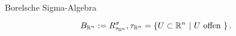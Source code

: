 \documentclass[class=article, crop=false]{standalone}
\begin{document}
\begin{zettel}
\begin{flashcard}[37rz9nm4]{Borelsche Sigma-Algebra}
	\begin{definition}
		\[
			B_{\R^n} := R_{\tau_{\R^n}}^{\sigma}, \tau_{\R^n} = \set{ U \subset  \R^n}{ U \tx{offen} }
		.\]
	\end{definition}
\end{flashcard}
\end{zettel}
\end{document}
